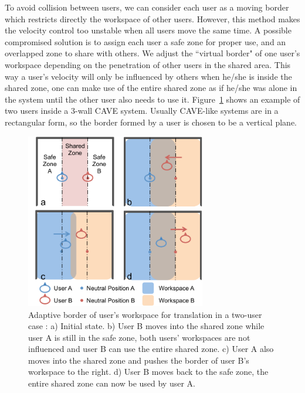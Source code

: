 To avoid collision between users, we can consider each user as a moving border which restricts directly the workspace of other users. However, this method makes the velocity control too unstable when all users move the same time. A possible compromised solution is to assign each user a safe zone for proper use, and an overlapped zone to share with others. We adjust the ``virtual border" of one user's workspace depending on the penetration of other users in the shared area. This way a user's velocity will only be influenced by others when he/she is inside the shared zone, one can make use of the entire shared zone as if he/she was alone in the system until the other user also needs to use it. Figure~\ref{fig:4_adaptive_trans_border} shows an example of two users inside a 3-wall CAVE system. Usually CAVE-like systems are in a rectangular form, so the border formed by a user is chosen to be a vertical plane.

\begin{figure}[htb]
\begin{center}
\includegraphics[width=0.7\textwidth]{figures/ch4/adaptive_trans_border}
\end{center}
\caption{\label{fig:4_adaptive_trans_border}Adaptive border of user's workspace for translation in a two-user case : a) Initial state. b) User B moves into the shared zone while user A is still in the safe zone, both users' workspaces are not influenced and user B can use the entire shared zone. c) User A also moves into the shared zone and pushes the border of user B's workspace to the right. d) User B moves back to the safe zone, the entire shared zone can now be used by user A.}
\end{figure}

